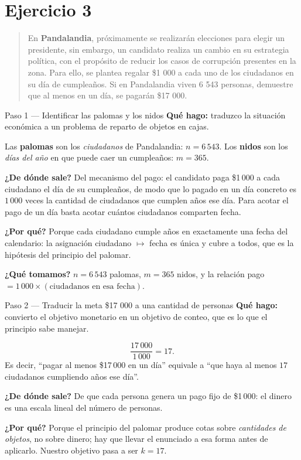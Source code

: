 \documentclass[11pt]{article}
\begin{document}
\section*{Ejercicio 3}

\begin{quote}
En \textbf{Pandalandia}, próximamente se realizarán elecciones para elegir un presidente, sin embargo, un candidato realiza un cambio en su estrategia política, con el propósito de reducir los casos de corrupción presentes en la zona. Para ello, se plantea regalar \$1 000 a cada uno de los ciudadanos en su día de cumpleaños. Si en Pandalandia viven 6 543 personas, demuestre que al menos en un día, se pagarán \$17 000.
\end{quote}

\begin{paso}{Paso 1 --- Identificar las palomas y los nidos}
\textbf{Qué hago:} traduzco la situación económica a un problema de reparto de objetos en cajas.

Las \textbf{palomas} son los \emph{ciudadanos} de Pandalandia: $n=6\,543$. Los \textbf{nidos} son los \emph{días del año} en que puede caer un cumpleaños: $m=365$.

\textbf{¿De dónde sale?} Del mecanismo del pago: el candidato paga \$1\,000 a cada ciudadano el día de su cumpleaños, de modo que lo pagado en un día concreto es $1\,000$ veces la cantidad de ciudadanos que cumplen años ese día. Para acotar el pago de un día basta acotar cuántos ciudadanos comparten fecha.

\textbf{¿Por qué?} Porque cada ciudadano cumple años en exactamente una fecha del calendario: la asignación ciudadano $\mapsto$ fecha es única y cubre a todos, que es la hipótesis del principio del palomar.

\textbf{¿Qué tomamos?} $n=6\,543$ palomas, $m=365$ nidos, y la relación pago $=1\,000\times(\text{ciudadanos en esa fecha})$.
\end{paso}

\begin{paso}{Paso 2 --- Traducir la meta \$17 000 a una cantidad de personas}
\textbf{Qué hago:} convierto el objetivo monetario en un objetivo de conteo, que es lo que el principio sabe manejar.

\[
\frac{17\,000}{1\,000}=17 .
\]
Es decir, ``pagar al menos \$17\,000 en un día'' equivale a ``que haya al menos $17$ ciudadanos cumpliendo años ese día''.

\textbf{¿De dónde sale?} De que cada persona genera un pago fijo de \$1\,000: el dinero es una escala lineal del número de personas.

\textbf{¿Por qué?} Porque el principio del palomar produce cotas sobre \emph{cantidades de objetos}, no sobre dinero; hay que llevar el enunciado a esa forma antes de aplicarlo. Nuestro objetivo pasa a ser $k=17$.
\end{paso}
\end{document}
